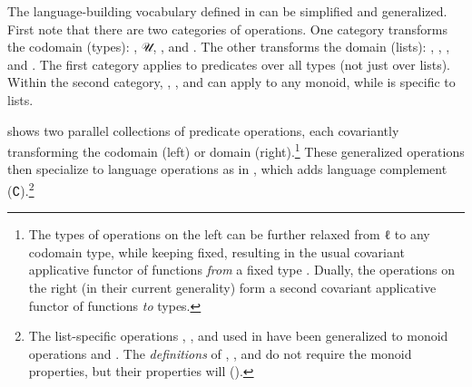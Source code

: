 \documentclass[acmsmall,screen,timestamp,anonymous,review]{acmart}
\begin{document}

\rnc{}

The language-building vocabulary defined in  can be simplified and generalized.
First note that there are two categories of operations.
One category transforms the codomain (types): , \AF 𝒰, , and .
The other transforms the domain (lists): , , , and .
The first category applies to predicates over all types (not just over lists).
Within the second category, , , and  can apply to any monoid, while  is specific to lists.

 shows two parallel collections of predicate operations, each covariantly transforming the codomain (left) or domain (right).\footnote{The types of operations on the left can be further relaxed from { \AB ℓ} to any codomain type, while keeping  fixed, resulting in the usual covariant applicative functor of functions \emph{from} a fixed type \citep{McBride2008APE}.
Dually, the operations on the right (in their current generality) form a second covariant applicative functor of functions \emph{to} types.}
These generalized operations then specialize to language operations as in , which adds language complement (\AF ∁).\footnote{The list-specific operations , \AIC{[]}, and  used in  have been generalized to monoid operations { and }.
The \emph{definitions} of , , and  do not require the monoid properties, but their properties will ().
}
\end{document}
